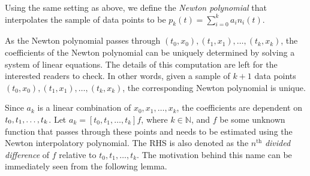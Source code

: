 \documentclass[a4paper,11pt,titlepage]{article}
\theoremstyle{definition}
\theoremstyle{plain}
\theoremstyle{remark}
\begin{document}
Using the same setting as above, we define the \textit{Newton polynomial} that interpolates the sample of data points to be $p_k(t)=\sum_{i=0}^ka_in_i(t)$.

As the Newton polynomial passes through $(t_0,x_0), (t_1,x_1), \dots, (t_k,x_k)$, the coefficients of the Newton polynomial can be uniquely determined by solving a system of linear equations. The details of this computation are left for the interested readers to check. In other words, given a sample of $k+1$ data points
$(t_0,x_0), (t_1,x_1), \dots, (t_k,x_k)$, the corresponding Newton polynomial is unique.

Since $a_k$ is a linear combination of $x_0,x_1,\dots,x_k$, the coefficients are dependent on $t_0,t_1,\dots,\\t_k$. Let $a_k=[t_0,t_1,\dots,t_k]f$, where $k\in\mathbb{N}$, and $f$ be some unknown function that passes through these points and needs to be estimated using the Newton interpolatory polynomial. The RHS is also denoted as the $n^{\mathrm{th}}$ \textit{divided difference} of $f$ relative to $t_0,t_1,\dots,t_k$. The motivation behind this name can be immediately seen from the following lemma.
\end{document}
